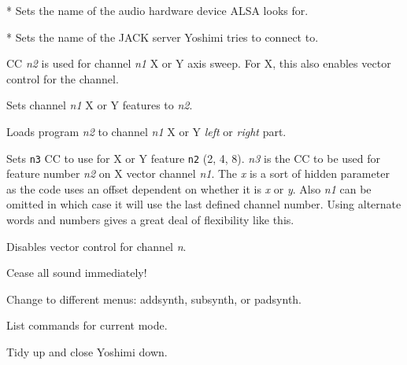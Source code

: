      * Sets the name of the audio hardware device ALSA looks for.

      * Sets the name of the JACK server Yoshimi tries to connect to.

      CC \textsl{n2} is used for channel \textsl{n1} X or Y axis sweep.
      For X, this also enables vector control for the channel.

      Sets channel \textsl{n1} X or Y features to \textsl{n2}.

      Loads program \textsl{n2} to channel \textsl{n1} X or Y
      \textsl{left} or \textsl{right} part.

      Sets \texttt{n3} CC to use for X or Y feature \texttt{n2} (2, 4, 8).
      \textsl{n3} is the CC to be used for feature number \textsl{n2} on X
      vector channel \textsl{n1}. The \textsl{x} is a sort of hidden parameter
      as the code uses an offset dependent on whether it is \textsl{x} or
      \textsl{y}. Also \textsl{n1} can be omitted in which case it will use the
      last defined channel number. Using alternate words and numbers gives a
      great deal of flexibility like this.

      Disables vector control for channel \textsl{n}.

      Cease all sound immediately!

      Change to different menus: addsynth, subsynth, or padsynth.

      List commands for current mode.

         Tidy up and close Yoshimi down.

